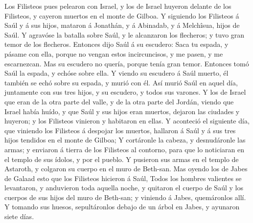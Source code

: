  Los Filisteos pues pelearon con Israel, y los de Israel
huyeron delante de los Filisteos, y cayeron muertos en el monte de
Gilboa.  Y siguiendo los Filisteos á Saúl y á sus hijos,
mataron á Jonathán, y á Abinadab, y á Melchîsua, hijos de Saúl.
 Y agravóse la batalla sobre Saúl, y le alcanzaron los
flecheros; y tuvo gran temor de los flecheros.  Entonces
dijo Saúl á su escudero: Saca tu espada, y pásame con ella, porque no
vengan estos incircuncisos, y me pasen, y me escarnezcan. Mas su
escudero no quería, porque tenía gran temor. Entonces tomó Saúl la
espada, y echóse sobre ella.  Y viendo su escudero á Saúl
muerto, él también se echó sobre su espada, y murió con él.
 Así murió Saúl en aquel día, juntamente con sus tres
hijos, y su escudero, y todos sus varones.  Y los de
Israel que eran de la otra parte del valle, y de la otra parte del
Jordán, viendo que Israel había huído, y que Saúl y sus hijos eran
muertos, dejaron las ciudades y huyeron; y los Filisteos vinieron y
habitaron en ellas.  Y aconteció el siguiente día, que
viniendo los Filisteos á despojar los muertos, hallaron á Saúl y á sus
tres hijos tendidos en el monte de Gilboa;  Y cortáronle
la cabeza, y desnudáronle las armas; y enviaron á tierra de los
Filisteos al contorno, para que lo noticiaran en el templo de sus
ídolos, y por el pueblo.  Y pusieron sus armas en el
templo de Astaroth, y colgaron su cuerpo en el muro de Beth-san.
 Mas oyendo los de Jabes de Galaad esto que los Filisteos
hicieron á Saúl,  Todos los hombres valientes se
levantaron, y anduvieron toda aquella noche, y quitaron el cuerpo de
Saúl y los cuerpos de sus hijos del muro de Beth-san; y viniendo á
Jabes, quemáronlos allí.  Y tomando sus huesos,
sepultáronlos debajo de un árbol en Jabes, y ayunaron siete días.
